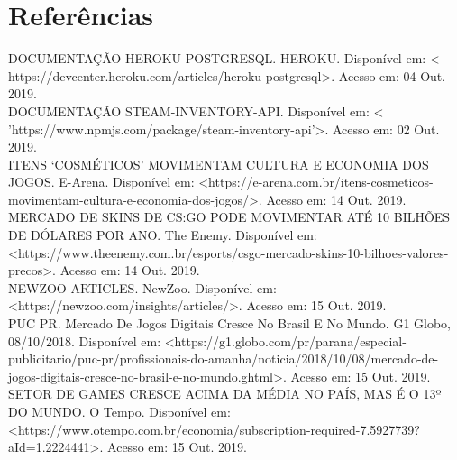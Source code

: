 
\chapter*[Referências]{Referências}
	\noindent
	DOCUMENTAÇÃO HEROKU POSTGRESQL. HEROKU.
	Disponível em: \textless
	https://devcenter.heroku.com/articles/heroku-postgresql\textgreater. Acesso em: 04 Out. 2019. \\
	
	\noindent
	DOCUMENTAÇÃO STEAM-INVENTORY-API.
	Disponível em: \textless
	'https://www.npmjs.com/package/steam-inventory-api'\textgreater. Acesso em: 02 Out. 2019. \\
    
    \noindent
    ITENS ‘COSMÉTICOS’ MOVIMENTAM CULTURA E ECONOMIA DOS JOGOS. E-Arena. Disponível em: \textless https://e-arena.com.br/itens-cosmeticos-movimentam-cultura-e-economia-dos-jogos/\textgreater. Acesso em: 14 Out. 2019. \\
    
    \noindent
    MERCADO DE SKINS DE CS:GO PODE MOVIMENTAR ATÉ 10 BILHÕES DE DÓLARES POR ANO. The Enemy. Disponível em:\textless https://www.theenemy.com.br/esports/csgo-mercado-skins-10-bilhoes-valores-precos\textgreater. Acesso em: 14 Out. 2019. \\
    
    \noindent
    NEWZOO ARTICLES. NewZoo. Disponível em: \textless https://newzoo.com/insights/articles/\textgreater. Acesso em: 15 Out. 2019. \\
    
    \noindent
    PUC PR. Mercado De Jogos Digitais Cresce No Brasil E No Mundo. G1 Globo, 08/10/2018. Disponível em: \textless https://g1.globo.com/pr/parana/especial-publicitario/puc-pr/profissionais-do-amanha/noticia/2018/10/08/mercado-de-jogos-digitais-cresce-no-brasil-e-no-mundo.ghtml\textgreater. Acesso em: 15 Out. 2019. \\
    
    \noindent
    SETOR DE GAMES CRESCE ACIMA DA MÉDIA NO PAÍS, MAS É O 13º DO MUNDO. O Tempo. Disponível em: \textless https://www.otempo.com.br/economia/subscription-required-7.5927739?aId=1.2224441\textgreater. Acesso em: 15 Out. 2019. \\
    


